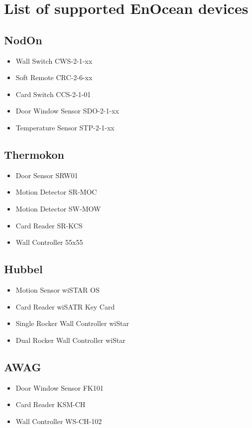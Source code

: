 \chapter{List of supported EnOcean devices}
\label{annexenocean}


\section{NodOn}
\begin{itemize}
\item Wall Switch CWS-2-1-xx
\item Soft Remote CRC-2-6-xx
\item Card Switch CCS-2-1-01
\item Door Window Sensor SDO-2-1-xx
\item Temperature Sensor STP-2-1-xx
\end{itemize}
\section{Thermokon}
\begin{itemize}
\item Door Sensor SRW01
\item Motion Detector SR-MOC
\item Motion Detector SW-MOW
\item Card Reader SR-KCS
\item Wall Controller 55x55
\end{itemize}
\section{Hubbel}
\begin{itemize}
\item Motion Sensor wiSTAR OS
\item Card Reader wiSATR Key Card
\item Single Rocker Wall Controller wiStar
\item Dual Rocker Wall Controller wiStar
\end{itemize}
\section{AWAG}
\begin{itemize}
\item Door Window Sensor FK101
\item Card Reader KSM-CH
\item Wall Controller WS-CH-102
\end{itemize}
